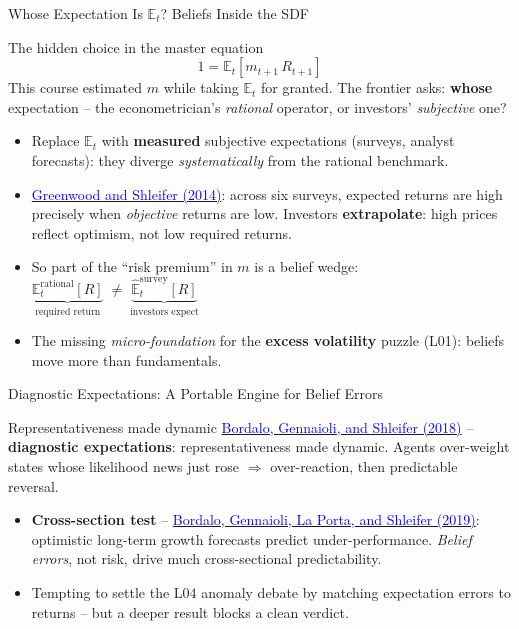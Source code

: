 \documentclass{beamer}
\newcommand{\E}{\mathbb{E}}
\begin{document}
\begin{frame}{Whose Expectation Is $\E_t$? Beliefs Inside the SDF}
\begin{block}{The hidden choice in the master equation}
\begin{equation*}
1 = \E_t\!\left[ m_{t+1}\, R_{t+1} \right]
\end{equation*}
This course estimated $m$ while \alert{taking $\E_t$ for granted}. The frontier asks: \textbf{whose} expectation -- the econometrician's \textit{rational} operator, or investors' \textit{subjective} one?
\end{block}
\begin{itemize}
  \item Replace $\E_t$ with \textbf{measured} subjective expectations (surveys, analyst forecasts): they diverge \textit{systematically} from the rational benchmark.
  \item \href{https://doi.org/10.1093/rfs/hht082}{\textcolor{blue}{Greenwood and Shleifer (2014)}}: across six surveys, expected returns are high precisely when \textit{objective} returns are \alert{low}. Investors \textbf{extrapolate}: high prices reflect \alert{optimism}, not low required returns.
  \item So part of the ``risk premium'' in $m$ is a \alert{belief wedge}: \quad $\underbrace{\E_t^{\text{rational}}[R]}_{\text{required return}} \;\neq\; \underbrace{\widehat{\E}_t^{\text{survey}}[R]}_{\text{investors expect}}$
  \item The missing \textit{micro-foundation} for the \textbf{excess volatility} puzzle (L01): \alert{beliefs} move more than fundamentals.
\end{itemize}
\end{frame}

\begin{frame}{Diagnostic Expectations: A Portable Engine for Belief Errors}
\begin{block}{Representativeness made dynamic}
\href{https://doi.org/10.1111/jofi.12586}{\textcolor{blue}{Bordalo, Gennaioli, and Shleifer (2018)}} -- \textbf{diagnostic expectations}: representativeness made dynamic. Agents over-weight states whose likelihood news just rose $\Rightarrow$ \alert{over-reaction}, then \alert{predictable reversal}.
\end{block}
\begin{itemize}
  \item \textbf{Cross-section test} -- \href{https://doi.org/10.1111/jofi.12833}{\textcolor{blue}{Bordalo, Gennaioli, La Porta, and Shleifer (2019)}}: optimistic long-term growth forecasts predict \alert{under}-performance. \textit{Belief errors}, not risk, drive much cross-sectional predictability.
  \item Tempting to settle the L04 anomaly debate by matching expectation errors to returns -- but a deeper result blocks a clean verdict.
\end{itemize}
\end{frame}
\end{document}
